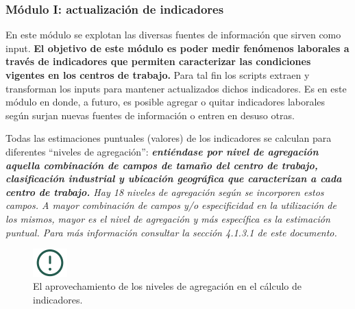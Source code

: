 \documentclass[
]{article}
\begin{document}
\hypertarget{moduloIexplicaciongeneral}{%
\subsubsection*{Módulo I: actualización de indicadores}\label{moduloIexplicaciongeneral}}

En este módulo se explotan las diversas fuentes de información que sirven como input. \textbf{El objetivo de este módulo es poder medir fenómenos laborales a través de indicadores que permiten caracterizar las condiciones vigentes en los centros de trabajo.} Para tal fin los scripts extraen y transforman los inputs para mantener actualizados dichos indicadores. Es en este módulo en donde, a futuro, es posible agregar o quitar indicadores laborales según surjan nuevas fuentes de información o entren en desuso otras.

Todas las estimaciones puntuales (valores) de los indicadores se calculan para diferentes ``niveles de agregación'': \emph{\textbf{entiéndase por nivel de agregación aquella combinación de campos de tamaño del centro de trabajo, clasificación industrial y ubicación geográfica que caracterizan a cada centro de trabajo.} Hay 18 niveles de agregación según se incorporen estos campos. A mayor combinación de campos y/o especificidad en la utilización de los mismos, mayor es el nivel de agregación y más específica es la estimación puntual. Para más información consultar la sección 4.1.3.1 de este documento.}

\begin{figure}
\includegraphics[width=50px,style="float:left; background-color: #fff; padding-right:1em"]{images-1/important-icon} \caption{El aprovechamiento de los niveles de agregación en el cálculo de indicadores.}\label{fig:utilidadestimacionespuntuales}
\end{figure}
\end{document}

